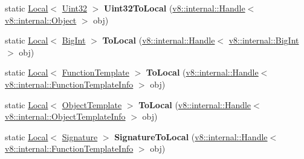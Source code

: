 \begin{DoxyCompactItemize}
\item 
\mbox{\label{classv8_1_1Utils_a96bfef03b36b951d5ccdd1e7baa6bd68}} 
static \mbox{\hyperlink{classv8_1_1Local}{Local}}$<$ \mbox{\hyperlink{classv8_1_1Uint32}{Uint32}} $>$ {\bfseries Uint32\+To\+Local} (\mbox{\hyperlink{classv8_1_1internal_1_1Handle}{v8\+::internal\+::\+Handle}}$<$ \mbox{\hyperlink{classv8_1_1internal_1_1Object}{v8\+::internal\+::\+Object}} $>$ obj)
\item 
\mbox{\label{classv8_1_1Utils_a144938ed29dce658298a253523252fcd}} 
static \mbox{\hyperlink{classv8_1_1Local}{Local}}$<$ \mbox{\hyperlink{classv8_1_1BigInt}{Big\+Int}} $>$ {\bfseries To\+Local} (\mbox{\hyperlink{classv8_1_1internal_1_1Handle}{v8\+::internal\+::\+Handle}}$<$ \mbox{\hyperlink{classv8_1_1internal_1_1BigInt}{v8\+::internal\+::\+Big\+Int}} $>$ obj)
\item 
\mbox{\label{classv8_1_1Utils_ac33191d795c39e9e142e1a5d8feb751d}} 
static \mbox{\hyperlink{classv8_1_1Local}{Local}}$<$ \mbox{\hyperlink{classv8_1_1FunctionTemplate}{Function\+Template}} $>$ {\bfseries To\+Local} (\mbox{\hyperlink{classv8_1_1internal_1_1Handle}{v8\+::internal\+::\+Handle}}$<$ \mbox{\hyperlink{classv8_1_1internal_1_1FunctionTemplateInfo}{v8\+::internal\+::\+Function\+Template\+Info}} $>$ obj)
\item 
\mbox{\label{classv8_1_1Utils_aaf6cbfcde80e059e2a912e398709541a}} 
static \mbox{\hyperlink{classv8_1_1Local}{Local}}$<$ \mbox{\hyperlink{classv8_1_1ObjectTemplate}{Object\+Template}} $>$ {\bfseries To\+Local} (\mbox{\hyperlink{classv8_1_1internal_1_1Handle}{v8\+::internal\+::\+Handle}}$<$ \mbox{\hyperlink{classv8_1_1internal_1_1ObjectTemplateInfo}{v8\+::internal\+::\+Object\+Template\+Info}} $>$ obj)
\item 
\mbox{\label{classv8_1_1Utils_ab74c0bc535e34d63518eb66be02f7a24}} 
static \mbox{\hyperlink{classv8_1_1Local}{Local}}$<$ \mbox{\hyperlink{classv8_1_1Signature}{Signature}} $>$ {\bfseries Signature\+To\+Local} (\mbox{\hyperlink{classv8_1_1internal_1_1Handle}{v8\+::internal\+::\+Handle}}$<$ \mbox{\hyperlink{classv8_1_1internal_1_1FunctionTemplateInfo}{v8\+::internal\+::\+Function\+Template\+Info}} $>$ obj)
\item 
\mbox{\label{classv8_1_1Utils_a7778219dad0e548e442cbd5d98f79f4a}} 

\end{DoxyCompactItemize}
